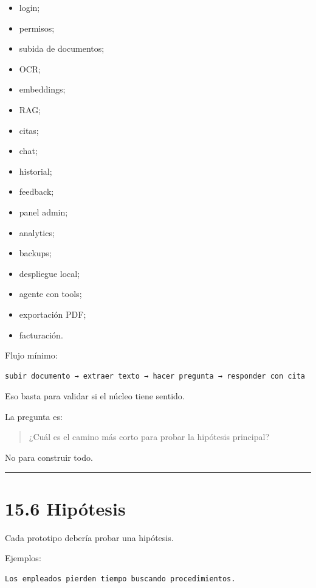 \begin{itemize}
\tightlist
\item
  login;
\item
  permisos;
\item
  subida de documentos;
\item
  OCR;
\item
  embeddings;
\item
  RAG;
\item
  citas;
\item
  chat;
\item
  historial;
\item
  feedback;
\item
  panel admin;
\item
  analytics;
\item
  backups;
\item
  despliegue local;
\item
  agente con tools;
\item
  exportación PDF;
\item
  facturación.
\end{itemize}

Flujo mínimo:

\begin{lstlisting}
subir documento → extraer texto → hacer pregunta → responder con cita
\end{lstlisting}

Eso basta para validar si el núcleo tiene sentido.

La pregunta es:

\begin{quote}
¿Cuál es el camino más corto para probar la hipótesis principal?
\end{quote}

No para construir todo.

\begin{center}\rule{0.5\linewidth}{0.5pt}\end{center}

\section{15.6 Hipótesis}\label{hipuxf3tesis}

Cada prototipo debería probar una hipótesis.

Ejemplos:

\begin{lstlisting}
Los empleados pierden tiempo buscando procedimientos.
\end{lstlisting}

